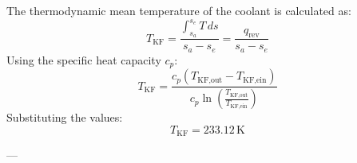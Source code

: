 The thermodynamic mean temperature of the coolant is calculated as:  
\[
T_{\text{KF}} = \frac{\int_{s_a}^{s_e} T \, ds}{s_a - s_e} = \frac{q_{\text{rev}}}{s_a - s_e}
\]  
Using the specific heat capacity \( c_p \):  
\[
T_{\text{KF}} = \frac{c_p (T_{\text{KF,out}} - T_{\text{KF,ein}})}{c_p \ln \left( \frac{T_{\text{KF,out}}}{T_{\text{KF,ein}}} \right)}
\]  
Substituting the values:  
\[
T_{\text{KF}} = 233.12 \, \text{K}
\]

---